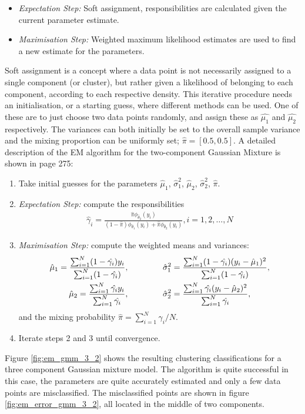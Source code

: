 \begin{itemize}
  \item \emph{Expectation Step:} Soft assignment, responsibilities are calculated given the current parameter estimate.
  \item \emph{Maximisation Step:} Weighted maximum likelihood estimates are used to find a new estimate for the parameters.
\end{itemize}
Soft assignment is a concept where a data point is not necessarily assigned to a single component (or cluster), but rather given a likelihood of belonging to each component, according to each respective density. This iterative procedure needs an initialisation, or a starting guess, where different methods can be used. One of these are to just choose two data points randomly, and assign these as $\hat{\mu_1}$ and $\hat{\mu_2}$ respectively. The variances can both initially be set to the overall sample variance and the mixing proportion can be uniformly set; $\hat{\pi} = [0.5,0.5]$. A detailed description of the EM algorithm for the two-component Gaussian Mixture is shown in \parencite{Hastie2001} page 275: 
\begin{enumerate}
\item Take initial guesses for the parameters $\hat{\mu}_1$, $\hat{\sigma}_1^2$, $\hat{\mu}_2$, $\hat{\sigma}_2^2$, $\hat{\pi}$.
\item \emph{Expectation Step:} compute the responsibilities
  \begin{align*}
    \hat{\gamma}_i = \frac{\hat{\pi}\phi_{\hat{\theta}_2}(y_i)}{(1-\hat{\pi})\phi_{\hat{\theta}_1}(y_i) + \hat{\pi}\phi_{\hat{\theta}_2}(y_i)}, i=1,2,\dots,N 
  \end{align*}
\item \emph{Maximisation Step:} compute the weighted means and variances:
  \begin{align*}
    \hat{\mu}_1 = \frac{\sum_{i=1}^N(1-\hat{\gamma_i})y_i}{\sum_{i=1}^N(1-\hat{\gamma_i})},&
\hspace{15 mm} 
    \hat{\sigma}_1^2 = \frac{\sum_{i=1}^N(1-\hat{\gamma_i})(y_i-\hat{\mu}_1)^2}{\sum_{i=1}^N(1-\hat{\gamma_i})}, \\
    \hat{\mu}_2 = \frac{\sum_{i=1}^N\hat{\gamma_i}y_i}{\sum_{i=1}^N\hat{\gamma_i}},&
\hspace{15 mm}
    \hat{\sigma}_2^2 = \frac{\sum_{i=1}^N\hat{\gamma_i}(y_i-\hat{\mu}_2)^2}{\sum_{i=1}^N\hat{\gamma_i}},
  \end{align*}
and the mixing probability $\hat{\pi}=\sum_{i=1}^N \hat{\gamma}_i/N$.
\item Iterate steps 2 and 3 until convergence.
\end{enumerate}
Figure \ref{fig:em_gmm_3_2} shows the resulting clustering classifications for a three component Gaussian mixture model. The algorithm is quite successful in this case, the parameters are quite accurately estimated and only a few data points are misclassified. The misclassified points are shown in figure \ref{fig:em_error_gmm_3_2}, all located in the middle of two components.


